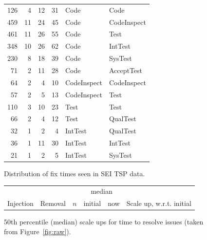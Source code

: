 \documentclass{sig-alternate}
\newcommand{\fig}[1]{Figure~\ref{fig:#1}}
\def\baselinestretch{1}
\begin{document}
\begin{figure}[!t]
\begin{center}
\begin{tabular}{r|rrr|ll}
126& 4& 12& 31&  Code&Code\\
459& 11& 24& 45&  Code&CodeInspect\\
461& 11& 26& 55&  Code&Test\\
348& 10& 26& 62&  Code&IntTest\\
230& 8& 18& 39&  Code&SysTest\\
71& 2& 11& 28&  Code&AcceptTest\\\hline

64& 2& 4& 10&  CodeInspect&CodeInspect\\
57& 2& 5& 13&  CodeInspect&Test\\\hline



110& 3& 10& 23&  Test&Test\\
66& 2& 4& 12&  Test&QualTest\\\hline


32& 1& 2& 4&  IntTest&QualTest\\
36& 1& 11& 30&  IntTest&IntTest\\
21& 1& 2& 5&  IntTest&SysTest\\
 \end{tabular}
\end{center}
\caption{Distribution of fix times seen in SEI TSP data.}
\label{fig:faw}
\end{figure}
 

\begin{figure}[!t]
\renewcommand{\baselinestretch}{0.7}
\scriptsize
\begin{center}
\begin{tabular}{l@{~~}|l@{~}|r@{~}|r@{~}r@{~}|r@{~}l}
           \multicolumn{2}{c}{~}                 &  &\multicolumn{2}{c|}{median}\\
  Injection&   Removal& $n$ & initial & now & \multicolumn{2}{l}{Scale up, w.r.t. initial}

\end{tabular}
\end{center}
\caption{50th percentile (median) scale ups  for  time to resolve issues (taken from \fig{raw}).}
\label{fig:scale}
\end{figure}
\end{document}
